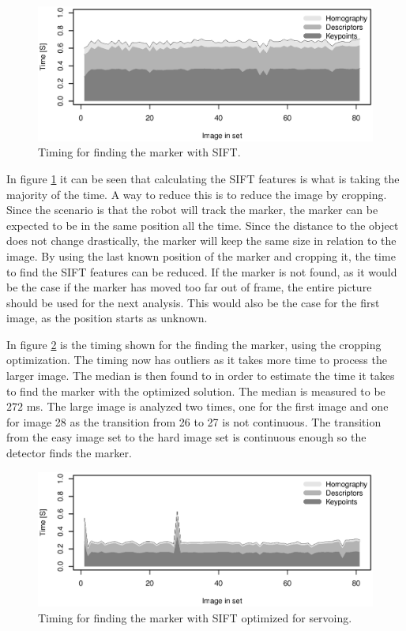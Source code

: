 \begin{figure}[h]
 \centering
 \includegraphics[width=\linewidth]{graphics/marker3_timing_unoptimized}
 \caption{Timing for finding the marker with SIFT.}
 \label{fig:time_sift_unoptimized}
\end{figure}

In figure \ref{fig:time_sift_unoptimized} it can be seen that calculating the SIFT features is what is taking the majority of the time.
A way to reduce this is to reduce the image by cropping.
Since the scenario is that the robot will track the marker, the marker can be expected to be in the same position all the time.
Since the distance to the object does not change drastically, the marker will keep the same size in relation to the image.
By using the last known position of the marker and cropping it, the time to find the SIFT features can be reduced.
If the marker is not found, as it would be the case if the marker has moved too far out of frame, the entire picture should be used for the next analysis.
This would also be the case for the first image, as the position starts as unknown.

In figure \ref{fig:time_sift_crop} is the timing shown for the finding the marker, using the cropping optimization.
The timing now has outliers as it takes more time to process the larger image.
The median is then found to in order to estimate the time it takes to find the marker with the optimized solution.
The median is measured to be $272$ ms.
The large image is analyzed two times, one for the first image and one for image 28 as the transition from 26 to 27 is not continuous.
The transition from the easy image set to the hard image set is continuous enough so the detector finds the marker.

\begin{figure}[h]
 \centering
 \includegraphics[width=\linewidth]{graphics/marker3_timing_crop}
 \caption{Timing for finding the marker with SIFT optimized for servoing.}
 \label{fig:time_sift_crop}
\end{figure}
